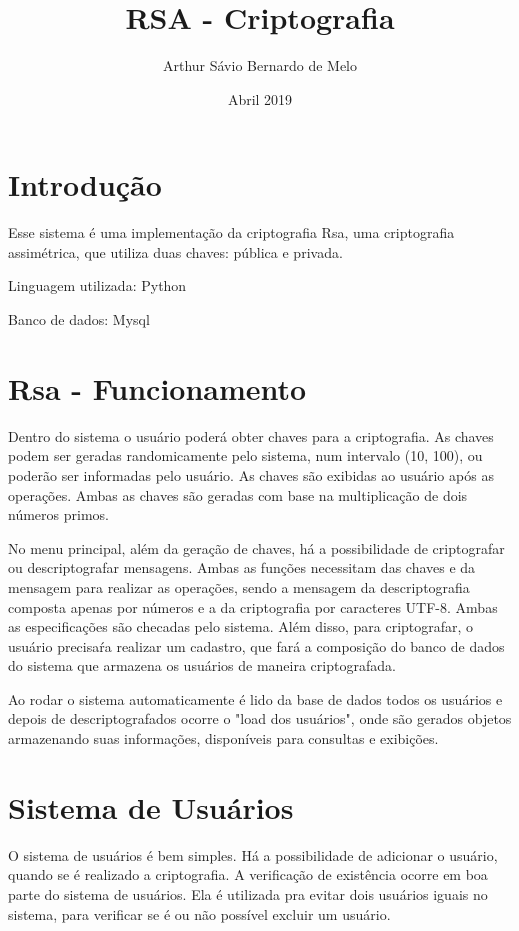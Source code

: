 \documentclass{article}
\title{RSA - Criptografia}
\author{Arthur Sávio Bernardo de Melo }
\date{Abril 2019}
\begin{document}
\maketitle

\section{Introdução}
Esse sistema é uma implementação da criptografia Rsa, uma criptografia assimétrica, que utiliza duas chaves: pública e privada.

Linguagem utilizada: Python

Banco de dados: Mysql

\section{Rsa - Funcionamento}
Dentro do sistema o usuário poderá obter chaves para a criptografia. As chaves podem ser geradas randomicamente pelo sistema, num intervalo (10, 100), ou poderão ser informadas pelo usuário. As chaves são exibidas ao usuário após as operações. Ambas as chaves são geradas com base na multiplicação de dois números primos.

No menu principal, além da geração de chaves, há a possibilidade de criptografar ou descriptografar mensagens. Ambas as funções necessitam das chaves e da mensagem para realizar as operações, sendo a mensagem da descriptografia composta apenas por números e a da criptografia por caracteres UTF-8. Ambas as especificações são checadas pelo sistema. Além disso, para criptografar, o usuário precisaŕa realizar um cadastro, que fará a composição do banco de dados do sistema que armazena os usuários de maneira criptografada.

Ao rodar o sistema automaticamente é lido da base de dados todos os usuários e depois de descriptografados ocorre o "load dos usuários", onde são gerados objetos armazenando suas informações, disponíveis para consultas e exibições.

\section{Sistema de Usuários}
O sistema de usuários é bem simples. Há a possibilidade de adicionar o usuário, quando se é realizado a criptografia. A verificação de existência ocorre em boa parte do sistema de usuários. Ela é utilizada pra evitar dois usuários iguais no sistema, para verificar se é ou não possível excluir um usuário.
\end{document}
